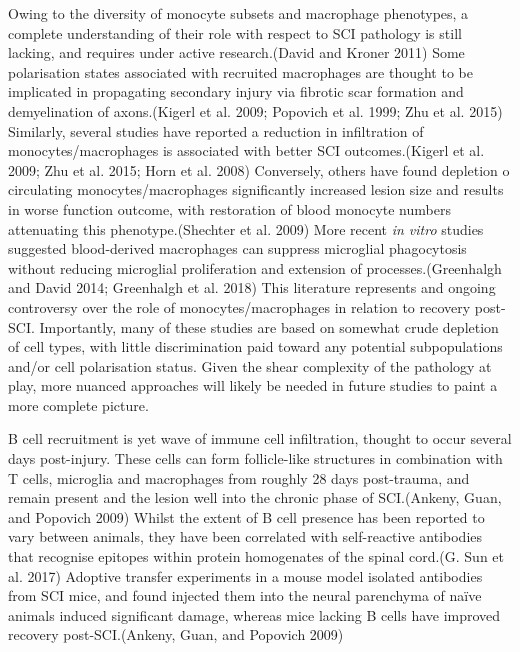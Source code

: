 \documentclass[9pt,lineno]{elife}
\begin{document}
\begin{landscape}
\begin{landscape}
Owing to the diversity of monocyte subsets and macrophage phenotypes, a complete understanding of their role with respect to SCI pathology is still lacking, and requires under active research.(David and Kroner 2011) Some polarisation states associated with recruited macrophages are thought to be implicated in propagating secondary injury via fibrotic scar formation and demyelination of axons.(Kigerl et al. 2009; Popovich et al. 1999; Zhu et al. 2015) Similarly, several studies have reported a reduction in infiltration of monocytes/macrophages is associated with better SCI outcomes.(Kigerl et al. 2009; Zhu et al. 2015; Horn et al. 2008) Conversely, others have found depletion o circulating monocytes/macrophages significantly increased lesion size and results in worse function outcome, with restoration of blood monocyte numbers attenuating this phenotype.(Shechter et al. 2009) More recent \emph{in vitro} studies suggested blood-derived macrophages can suppress microglial phagocytosis without reducing microglial proliferation and extension of processes.(Greenhalgh and David 2014; Greenhalgh et al. 2018) This literature represents and ongoing controversy over the role of monocytes/macrophages in relation to recovery post-SCI.
Importantly, many of these studies are based on somewhat crude depletion of cell types, with little discrimination paid toward any potential subpopulations and/or cell polarisation status.
Given the shear complexity of the pathology at play, more nuanced approaches will likely be needed in future studies to paint a more complete picture.

B cell recruitment is yet wave of immune cell infiltration, thought to occur several days post-injury.
These cells can form follicle-like structures in combination with T cells, microglia and macrophages from roughly 28 days post-trauma, and remain present and the lesion well into the chronic phase of SCI.(Ankeny, Guan, and Popovich 2009) Whilst the extent of B cell presence has been reported to vary between animals, they have been correlated with self-reactive antibodies that recognise epitopes within protein homogenates of the spinal cord.(G. Sun et al. 2017) Adoptive transfer experiments in a mouse model isolated antibodies from SCI mice, and found injected them into the neural parenchyma of naïve animals induced significant damage, whereas mice lacking B cells have improved recovery post-SCI.(Ankeny, Guan, and Popovich 2009)


\end{landscape}
\end{landscape}
\end{document}
